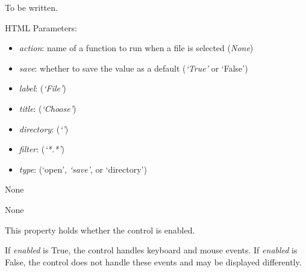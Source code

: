 \documentclass[letterpaper,10pt,english]{sphinxmanual}
\begin{document}
\begin{fulllineitems}
\label{api:controls.FilePicker}
To be written.

HTML Parameters:
\begin{itemize}
\item {} 
\emph{action}: name of a function to run when a file is selected (\emph{None})

\item {} 
\emph{save}: whether to save the value as a default (\emph{`True'} or `False')

\item {} 
\emph{label}: (\emph{`File'})

\item {} 
\emph{title}: (\emph{`Choose'})

\item {} 
\emph{directory}: (\emph{`'})

\item {} 
\emph{filter}: (\emph{`*.*'})

\item {} 
\emph{type}: (`open', \emph{`save'}, or `directory')

\end{itemize}

\begin{fulllineitems}
\label{api:controls.FilePicker.action}
None

\end{fulllineitems}


\begin{fulllineitems}
\label{api:controls.FilePicker.browse}
None

\end{fulllineitems}


\begin{fulllineitems}
\label{api:controls.FilePicker.enabled}
This property holds whether the control is enabled.

If \emph{enabled} is True, the control handles keyboard and mouse events.
If \emph{enabled} is False, the control does not handle these events and may
be displayed differently.


\end{fulllineitems}
\end{fulllineitems}
\end{document}
